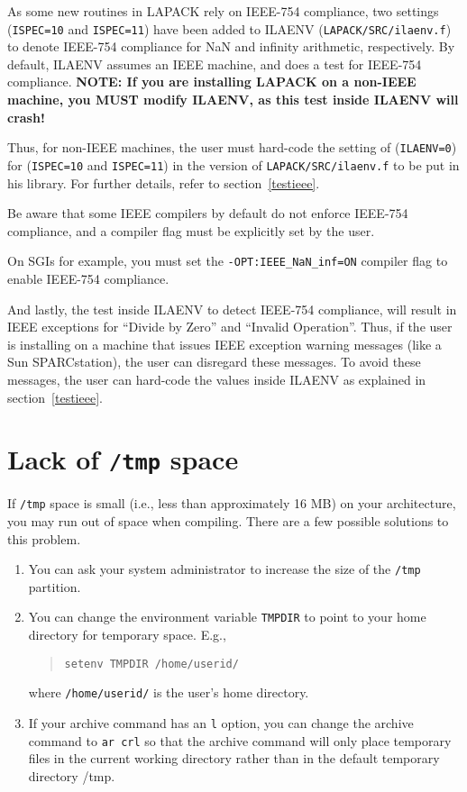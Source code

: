 As some new routines in LAPACK rely on IEEE-754 compliance,
two settings ({\tt ISPEC=10} and {\tt ISPEC=11}) have been added to ILAENV
({\tt LAPACK/SRC/ilaenv.f}) to denote IEEE-754 compliance for NaN and
infinity arithmetic, respectively.  By default, ILAENV assumes an IEEE
machine, and does a test for IEEE-754 compliance.  {\bf NOTE:  If you
are installing LAPACK on a non-IEEE machine, you MUST modify ILAENV,
as this test inside ILAENV will crash!}

Thus, for non-IEEE machines, the user must hard-code the setting of
({\tt ILAENV=0}) for ({\tt ISPEC=10} and {\tt ISPEC=11}) in the version
of {\tt LAPACK/SRC/ilaenv.f} to be put in
his library.  For further details, refer to section~\ref{testieee}.

Be aware
that some IEEE compilers by default do not enforce IEEE-754 compliance, and
a compiler flag must be explicitly set by the user.

On SGIs for example, you must set the {\tt -OPT:IEEE\_NaN\_inf=ON} compiler
flag to enable IEEE-754 compliance.

And lastly, the test inside ILAENV to detect IEEE-754 compliance, will
result in IEEE exceptions for ``Divide by Zero'' and ``Invalid Operation''.
Thus, if the user is installing on a machine that issues IEEE exception
warning messages (like a Sun SPARCstation), the user can disregard these
messages.  To avoid these messages, the user can hard-code the values
inside ILAENV as explained in section~\ref{testieee}.

\section{Lack of {\tt /tmp} space}

If {\tt /tmp} space is small (i.e., less than approximately 16 MB) on your
architecture, you may run out of space
when compiling.  There are a few possible solutions to this problem.
\begin{enumerate}
\item You can ask your system administrator to increase the size of the
{\tt /tmp} partition.
\item You can change the environment variable {\tt TMPDIR} to point to
your home directory for temporary space.  E.g.,
\begin{quote}
{\tt setenv TMPDIR /home/userid/}
\end{quote}
where {\tt /home/userid/} is the user's home directory.
\item If your archive command has an {\tt l} option, you can change the
archive command to {\tt ar crl} so that the
archive command will only place temporary files in the current working
directory rather than in the default temporary directory /tmp.
\end{enumerate}

